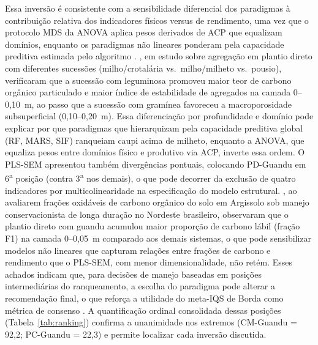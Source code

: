 \documentclass[pdflatex,sn-basic]{sn-jnl}%
\begin{document}
Essa inversão é consistente com a sensibilidade diferencial dos paradigmas à contribuição relativa dos indicadores físicos versus de rendimento, uma vez que o protocolo MDS da ANOVA aplica pesos derivados de ACP que equalizam domínios, enquanto os paradigmas não lineares ponderam pela capacidade preditiva estimada pelo algoritmo \cite{Chaudhry2024}. \cite{Fernandes2022}, em estudo sobre agregação em plantio direto com diferentes sucessões (milho/crotalária vs.\ milho/milheto vs.\ pousio), verificaram que a sucessão com leguminosa promoveu maior teor de carbono orgânico particulado e maior índice de estabilidade de agregados na camada 0--0,10~m, ao passo que a sucessão com gramínea favoreceu a macroporosidade subsuperficial (0,10--0,20~m). Essa diferenciação por profundidade e domínio pode explicar por que paradigmas que hierarquizam pela capacidade preditiva global (RF, MARS, SIF) ranqueiam caupi acima de milheto, enquanto a ANOVA, que equaliza pesos entre domínios físico e produtivo via ACP, inverte essa ordem. O PLS-SEM apresentou também divergências pontuais, colocando PD-Guandu em 6\textsuperscript{a} posição (contra 3\textsuperscript{a} nos demais), o que pode decorrer da exclusão de quatro indicadores por multicolinearidade na especificação do modelo estrutural. \cite{OliveiraFCC2024}, ao avaliarem frações oxidáveis de carbono orgânico do solo em Argissolo sob manejo conservacionista de longa duração no Nordeste brasileiro, observaram que o plantio direto com guandu acumulou maior proporção de carbono lábil (fração F1) na camada 0--0,05~m comparado aos demais sistemas, o que pode sensibilizar modelos não lineares que capturam relações entre frações de carbono e rendimento que o PLS-SEM, com menor dimensionalidade, não retém. Esses achados indicam que, para decisões de manejo baseadas em posições intermediárias do ranqueamento, a escolha do paradigma pode alterar a recomendação final, o que reforça a utilidade do meta-IQS de Borda como métrica de consenso \cite{Lin2010}. A quantificação ordinal consolidada dessas posições (Tabela~\ref{tab:ranking}) confirma a unanimidade nos extremos (CM-Guandu = 92,2; PC-Guandu = 22,3) e permite localizar cada inversão discutida.
\end{document}

